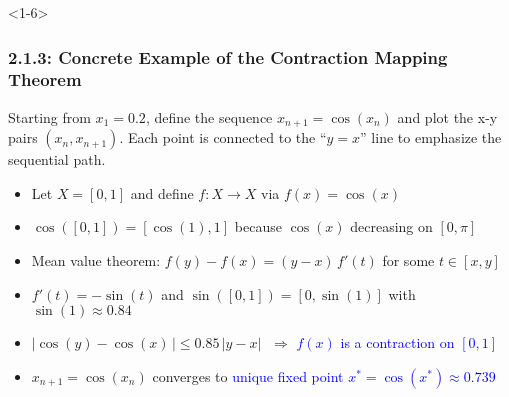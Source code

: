 \documentclass[10pt,english,aspectratio=169]{beamer}
\begin{document}
\begin{frame}<1-6> \frametitle{2.1.3: Concrete Example of the Contraction Mapping Theorem}

\vspace{1mm}
\begin{minipage}{0.45\textwidth}
Starting from $x_1 = 0.2$, define the sequence $x_{n+1}= \cos(x_n)$ and plot the x-y pairs $(x_n,x_{n+1})$.  Each point is connected to the ``$y\!=\!x$'' line to emphasize the sequential path.
\end{minipage}
\begin{minipage}{0.5\textwidth}
\scalebox{0.72}{}
\end{minipage}
\vspace{0mm}

\begin{itemize}
\setlength\itemsep{1.25mm}
\item<1-> Let $X=[0,1]$ and define $f\colon X\to X$ via $f(x)=\cos(x)$

\item<2-> $\cos([0,1]) = [\cos(1),1]$ because $\cos(x)$ decreasing on $[0,\pi]$

\item<3-> Mean value theorem: $f(y)-f(x) = (y-x)\,f'(t)$ for some $t\in [x,y]$

\item<4-> $f'(t) = -\sin(t)$ and $\sin([0,1]) = [0,\sin(1)]$ with $\sin(1) \approx 0.84$

\item<5-> $| \cos(y) - \cos(x) \,| \leq 0.85 \, |y-x|$ $\;\Rightarrow$ \textcolor{blue}{$f(x)$ is a contraction on $[0,1]$}

\item<6-> $x_{n+1} \!= \cos(x_n)$  converges to \textcolor{blue}{unique fixed point $x^* \!= \cos(x^*) \!\approx\! 0.739$}
\end{itemize}


\end{frame}  
\end{document}
